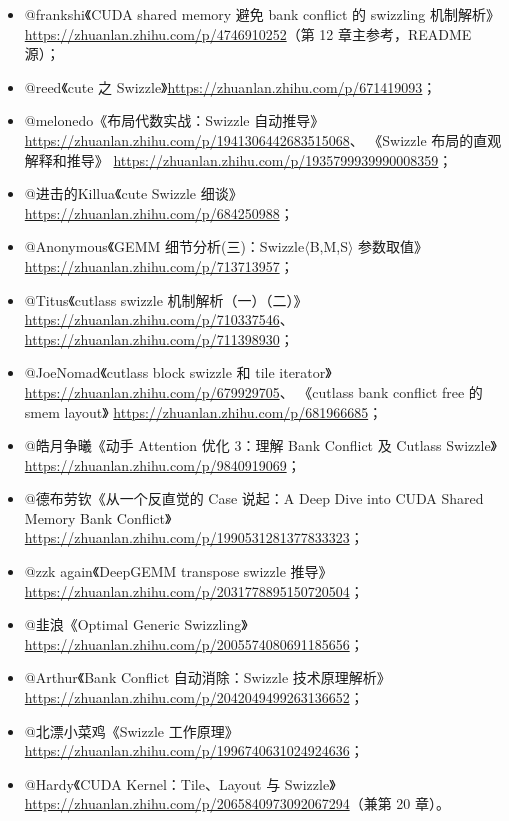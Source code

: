 \begin{itemize}
  \item @frankshi《CUDA shared memory 避免 bank conflict 的 swizzling 机制解析》
        \url{https://zhuanlan.zhihu.com/p/4746910252}（第 12 章主参考，README 源）；
  \item @reed《cute 之 Swizzle》\url{https://zhuanlan.zhihu.com/p/671419093}；
  \item @melonedo《布局代数实战：Swizzle 自动推导》
        \url{https://zhuanlan.zhihu.com/p/1941306442683515068}、
        《Swizzle 布局的直观解释和推导》
        \url{https://zhuanlan.zhihu.com/p/1935799939990008359}；
  \item @进击的Killua《cute Swizzle 细谈》
        \url{https://zhuanlan.zhihu.com/p/684250988}；
  \item @Anonymous《GEMM 细节分析(三)：Swizzle$\langle$B,M,S$\rangle$ 参数取值》
        \url{https://zhuanlan.zhihu.com/p/713713957}；
  \item @Titus《cutlass swizzle 机制解析（一）（二）》
        \url{https://zhuanlan.zhihu.com/p/710337546}、
        \url{https://zhuanlan.zhihu.com/p/711398930}；
  \item @JoeNomad《cutlass block swizzle 和 tile iterator》
        \url{https://zhuanlan.zhihu.com/p/679929705}、
        《cutlass bank conflict free 的 smem layout》
        \url{https://zhuanlan.zhihu.com/p/681966685}；
  \item @皓月争曦《动手 Attention 优化 3：理解 Bank Conflict 及 Cutlass Swizzle》
        \url{https://zhuanlan.zhihu.com/p/9840919069}；
  \item @德布劳钦《从一个反直觉的 Case 说起：A Deep Dive into CUDA Shared
        Memory Bank Conflict》\url{https://zhuanlan.zhihu.com/p/1990531281377833323}；
  \item @zzk again《DeepGEMM transpose swizzle 推导》
        \url{https://zhuanlan.zhihu.com/p/2031778895150720504}；
  \item @韭浪《Optimal Generic Swizzling》
        \url{https://zhuanlan.zhihu.com/p/2005574080691185656}；
  \item @Arthur《Bank Conflict 自动消除：Swizzle 技术原理解析》
        \url{https://zhuanlan.zhihu.com/p/2042049499263136652}；
  \item @北漂小菜鸡《Swizzle 工作原理》
        \url{https://zhuanlan.zhihu.com/p/1996740631024924636}；
  \item @Hardy《CUDA Kernel：Tile、Layout 与 Swizzle》
        \url{https://zhuanlan.zhihu.com/p/2065840973092067294}（兼第 20 章）。
\end{itemize}

